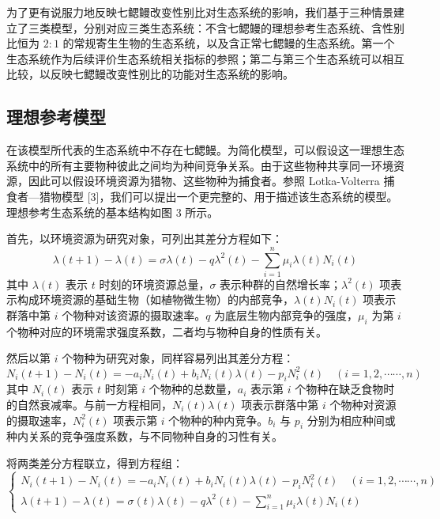 \documentclass[11pt,a4paper]{ctexart}
\begin{document}
为了更有说服力地反映七鳃鳗改变性别比对生态系统的影响，我们基于三种情景建立了三类模型，分别对应三类生态系统：不含七鳃鳗的理想参考生态系统、含性别比恒为 $2:1$ 的常规寄生生物的生态系统，以及含正常七鳃鳗的生态系统。第一个生态系统作为后续评价生态系统相关指标的参照；第二与第三个生态系统可以相互比较，以反映七鳃鳗改变性别比的功能对生态系统的影响。

\subsection{理想参考模型}

在该模型所代表的生态系统中不存在七鳃鳗。为简化模型，可以假设这一理想生态系统中的所有主要物种彼此之间均为种间竞争关系。由于这些物种共享同一环境资源，因此可以假设环境资源为猎物、这些物种为捕食者。参照 Lotka-Volterra 捕食者—猎物模型 [3]，我们可以提出一个更完整的、用于描述该生态系统的模型。理想参考生态系统的基本结构如图 3 所示。

首先，以环境资源为研究对象，可列出其差分方程如下：
\begin{equation}
\lambda(t+1)-\lambda(t)=\sigma\lambda(t)-q\lambda^{2}(t)-\sum_{i=1}^{n}\mu_{i}\lambda(t)N_{i}(t)
\end{equation}
其中 $\lambda(t)$ 表示 $t$ 时刻的环境资源总量，$\sigma$ 表示种群的自然增长率；$\lambda^{2}(t)$ 项表示构成环境资源的基础生物（如植物微生物）的内部竞争，$\lambda(t)N_{i}(t)$ 项表示群落中第 $i$ 个物种对该资源的摄取速率。$q$ 为底层生物内部竞争的强度，$\mu_{i}$ 为第 $i$ 个物种对应的环境需求强度系数，二者均与物种自身的性质有关。

然后以第 $i$ 个物种为研究对象，同样容易列出其差分方程：
\begin{equation}
N_{i}(t+1)-N_{i}(t)=-a_{i}N_{i}(t)+b_{i}N_{i}(t)\lambda(t)-p_{i}N_{i}^{2}(t)\quad (i=1,2,\cdots\cdots,n)
\end{equation}
其中 $N_{i}(t)$ 表示 $t$ 时刻第 $i$ 个物种的总数量，$a_{i}$ 表示第 $i$ 个物种在缺乏食物时的自然衰减率。与前一方程相同，$N_{i}(t)\lambda(t)$ 项表示群落中第 $i$ 个物种对资源的摄取速率，$N_{i}^{2}(t)$ 项表示第 $i$ 个物种的种内竞争。$b_{i}$ 与 $p_{i}$ 分别为相应种间或种内关系的竞争强度系数，与不同物种自身的习性有关。

将两类差分方程联立，得到方程组：
\begin{equation}
\begin{cases}
N_{i}(t+1)-N_{i}(t)=-a_{i}N_{i}(t)+b_{i}N_{i}(t)\lambda(t)-p_{i}N_{i}^{2}(t)\quad (i=1,2,\cdots\cdots,n)\\[6pt]
\lambda(t+1)-\lambda(t)=\sigma(t)\lambda(t)-q\lambda^{2}(t)-\sum\limits_{i=1}^{n}\mu_{i}\lambda(t)N_{i}(t)
\end{cases}
\end{equation}
\end{document}
